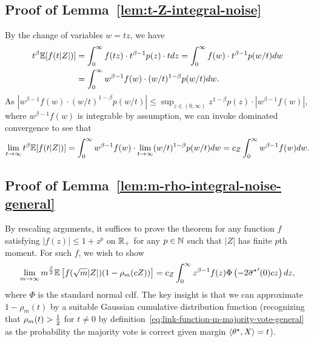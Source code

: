 \subsection{Proof of Lemma~\ref{lem:t-Z-integral-noise}}  \label{proof:t-Z-integral-noise}
By the change of variables $w =t z$, we have
\begin{align*}
	t^\beta \mathbb{E} [f(t|Z|)] & = \int_{0}^{\infty} f(t z) \cdot t^{\beta - 1} p(z)  \cdot td z =  \int_{0}^{\infty} f(w) \cdot t^{\beta-1} p (w/t) d w \\
	& =  \int_{0}^{\infty} w^{\beta - 1} f(w) \cdot (w/t)^{1-\beta} p (w/t) d w.
\end{align*}
As $|  w^{\beta - 1} f(w) \cdot (w/t)^{1-\beta} p (w/t)| \leq \sup_{z \in (0, \infty)} z^{1-\beta} p(z) \cdot |w^{\beta - 1} f(w)|$, where $w^{\beta - 1} f(w)$ is integrable by assumption, we can invoke dominated convergence to see that
\begin{align*}
	\lim_{t \to \infty} t^\beta \mathbb{E} [f(t|Z|)] = \int_{0}^{\infty} w^{\beta - 1} f(w) \cdot \lim_{t \to \infty} (w/t)^{1-\beta} p (w/t) d w = c_Z \int_{0}^{\infty} w^{\beta - 1} f(w) dw.
\end{align*}

\subsection{Proof of Lemma~\ref{lem:m-rho-integral-noise-general}} \label{proof:m-rho-integral-noise-general}
By rescaling arguments, it suffices to prove the theorem for any function
$f$ satisfying
$|f(z)| \leq 1 + z^p$ on $\mathbb{R}_+$ for any $p \in \mathbb{N}$ such that $|Z|$
has finite $p$th moment.  For such $f$, we wish to
show
\begin{align*}
  \lim_{m \to \infty} m^{\frac{\beta}{2}} \mathbb{E} \left[f(\sqrt{m}|Z|) (1 - \rho_m(c Z))\right] = c_Z \int_0^\infty z^{\beta-1} f(z) \Phi \left(-2 {\overline{\sigma}^\star}'(0) c z\right) dz,
\end{align*}
where $\Phi$ is the standard normal cdf. The key insight is that we can
approximate $1 - \rho_m(t)$ by a suitable Gaussian cumulative distribution
function (recognizing that $\rho_m(t) > \frac{1}{2}$ for $t \neq 0$ by
definition~\eqref{eq:link-function-m-majority-vote-general} as the
probability the majority vote is correct given margin
$\langle\theta^\star, X\rangle = t$).

